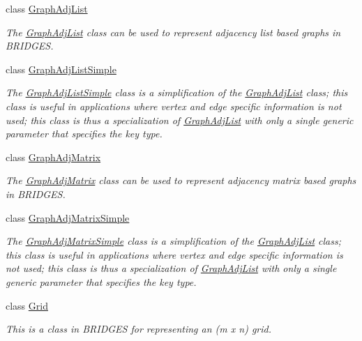\begin{DoxyCompactItemize}
class \hyperlink{classbridges_1_1base_1_1_graph_adj_list}{Graph\+Adj\+List}
\begin{DoxyCompactList}\small\item\em The \hyperlink{classbridges_1_1base_1_1_graph_adj_list}{Graph\+Adj\+List} class can be used to represent adjacency list based graphs in B\+R\+I\+D\+G\+ES. \end{DoxyCompactList}\item 
class \hyperlink{classbridges_1_1base_1_1_graph_adj_list_simple}{Graph\+Adj\+List\+Simple}
\begin{DoxyCompactList}\small\item\em The \hyperlink{classbridges_1_1base_1_1_graph_adj_list_simple}{Graph\+Adj\+List\+Simple} class is a simplification of the \hyperlink{classbridges_1_1base_1_1_graph_adj_list}{Graph\+Adj\+List} class; this class is useful in applications where vertex and edge specific information is not used; this class is thus a specialization of \hyperlink{classbridges_1_1base_1_1_graph_adj_list}{Graph\+Adj\+List} with only a single generic parameter that specifies the key type. \end{DoxyCompactList}\item 
class \hyperlink{classbridges_1_1base_1_1_graph_adj_matrix}{Graph\+Adj\+Matrix}
\begin{DoxyCompactList}\small\item\em The \hyperlink{classbridges_1_1base_1_1_graph_adj_matrix}{Graph\+Adj\+Matrix} class can be used to represent adjacency matrix based graphs in B\+R\+I\+D\+G\+ES. \end{DoxyCompactList}\item 
class \hyperlink{classbridges_1_1base_1_1_graph_adj_matrix_simple}{Graph\+Adj\+Matrix\+Simple}
\begin{DoxyCompactList}\small\item\em The \hyperlink{classbridges_1_1base_1_1_graph_adj_matrix_simple}{Graph\+Adj\+Matrix\+Simple} class is a simplification of the \hyperlink{classbridges_1_1base_1_1_graph_adj_list}{Graph\+Adj\+List} class; this class is useful in applications where vertex and edge specific information is not used; this class is thus a specialization of \hyperlink{classbridges_1_1base_1_1_graph_adj_list}{Graph\+Adj\+List} with only a single generic parameter that specifies the key type. \end{DoxyCompactList}\item 
class \hyperlink{classbridges_1_1base_1_1_grid}{Grid}
\begin{DoxyCompactList}\small\item\em This is a class in B\+R\+I\+D\+G\+ES for representing an (m x n) grid. \end{DoxyCompactList}\item 

\end{DoxyCompactItemize}
